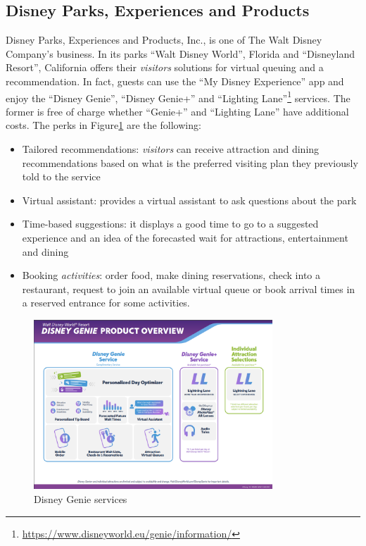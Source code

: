 \subsection{Disney Parks, Experiences and Products}\label{subsec:disney-parks-experiences-and-products}
Disney Parks, Experiences and Products, Inc., is one of The Walt Disney Company's business.
In its parks ``Walt Disney World'', Florida and ``Disneyland Resort'', California offers their \textit{visitors} solutions
for virtual queuing and a recommendation.
In fact, guests can use the ``My Disney Experience'' app and enjoy the ``Disney Genie'', ``Disney Genie+'' and ``Lighting Lane''\footnote{\url{https://www.disneyworld.eu/genie/information/}} services.
The former is free of charge whether ``Genie+'' and ``Lighting Lane'' have additional costs.
The perks in Figure\ref{fig:dgenie} are the following:

\begin{itemize}
	\item Tailored recommendations: \textit{visitors} can receive attraction and dining recommendations based on what is the preferred visiting plan they previously told
	      to the service
	\item Virtual assistant: provides a virtual assistant to ask questions about the park
	\item Time-based suggestions: it displays a good time to go to a suggested experience and an idea of the forecasted wait for attractions, entertainment and dining
	\item Booking \textit{activities}: order food, make dining reservations, check into a restaurant, request to join an available virtual queue or book arrival times in a reserved entrance for
	      some activities.
\end{itemize}

\begin{figure}[H]
	\centering
	\includegraphics[width=0.8\textwidth]{img/dgenie}
	\caption{Disney Genie services}
	\label{fig:dgenie}
\end{figure}
